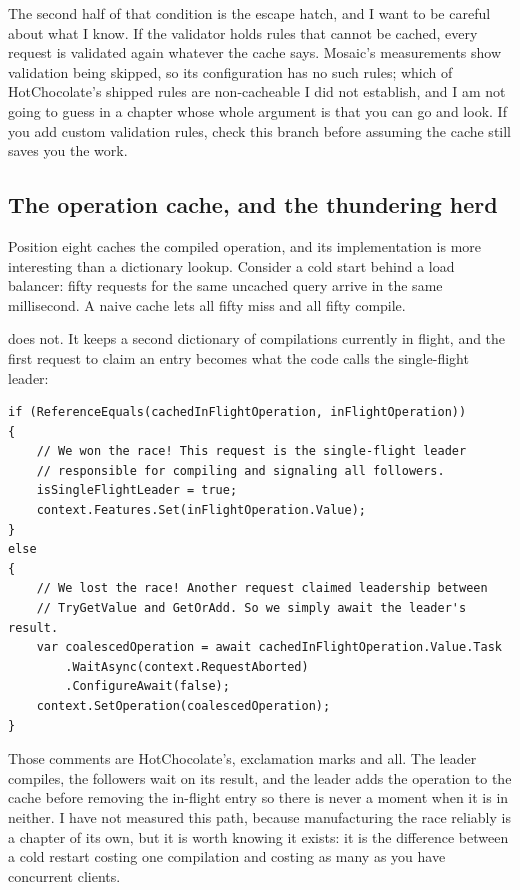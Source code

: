%
The second half of that condition is the escape hatch, and I want to be careful
about what I know. If the validator holds rules that cannot be cached, every
request is validated again whatever the cache says. Mosaic's measurements show
validation being skipped, so its configuration has no such rules; which of
HotChocolate's shipped rules are non-cacheable I did not establish, and I am not
going to guess in a chapter whose whole argument is that you can go and look. If
you add custom validation rules, check this branch before assuming the cache
still saves you the work.

\subsection*{The operation cache, and the thundering herd}

%
Position eight caches the compiled operation, and its implementation is more
interesting than a dictionary lookup. Consider a cold start behind a load
balancer: fifty requests for the same uncached query arrive in the same
millisecond. A naive cache lets all fifty miss and all fifty compile.

 does not. It keeps a second dictionary of
compilations currently in flight, and the first request to claim an entry
becomes what the code calls the single-flight leader:

\begin{verbatim}
if (ReferenceEquals(cachedInFlightOperation, inFlightOperation))
{
    // We won the race! This request is the single-flight leader
    // responsible for compiling and signaling all followers.
    isSingleFlightLeader = true;
    context.Features.Set(inFlightOperation.Value);
}
else
{
    // We lost the race! Another request claimed leadership between
    // TryGetValue and GetOrAdd. So we simply await the leader's result.
    var coalescedOperation = await cachedInFlightOperation.Value.Task
        .WaitAsync(context.RequestAborted)
        .ConfigureAwait(false);
    context.SetOperation(coalescedOperation);
}
\end{verbatim}

Those comments are HotChocolate's, exclamation marks and all. The leader
compiles, the followers wait on its result, and the leader adds the operation to
the cache before removing the in-flight entry so there is never a moment when it
is in neither. I have not measured this path, because manufacturing the race
reliably is a chapter of its own, but it is worth knowing it exists: it is the
difference between a cold restart costing one compilation and costing as many as
you have concurrent clients.

